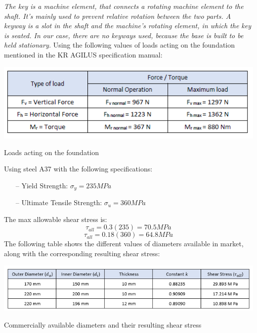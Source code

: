 \textit{The key is a machine element, that connects a rotating machine element to the shaft. It’s mainly used to prevent relative rotation between the two parts. A keyway is a slot in the shaft and the machine’s rotating element, in which the key is seated. In our case, there are no keyways used, because the base is built to be held stationary.}
\vspace{0.3 cm}
\newline Using the following values of loads acting on the foundation mentioned in the KR AGILUS specification manual:
\begin{table}[H]
\begin{center}
	\includegraphics[scale = 0.95]{Loads}
\end{center}	
\caption{Loads acting on the foundation}
\label{table:3}
\end{table}

Using steel A37 with the following specifications:
\begin{itemize}
	\item[--] Yield Strength: $\sigma_{y} = 235 MPa$
	\item[--] Ultimate Tensile Strength: $\sigma_{u} = 360 MPa$
\end{itemize}

The max allowable shear stress is:
$$ \tau_{all} = 0.3 (235) = 70.5 MPa $$
$$ \tau_{all} = 0.18 (360) = 64.8 MPa $$
\vspace{0.3 cm}
\newline The following table shows the different values of diameters available in market, along with the corresponding resulting shear stress:
\begin{table}[H]
	\begin{center}
		\includegraphics[scale = 0.95]{CalculationsResults}
	\end{center}	
\caption{Commercially available diameters and their resulting shear stress}
\label{table:4}
\end{table}

